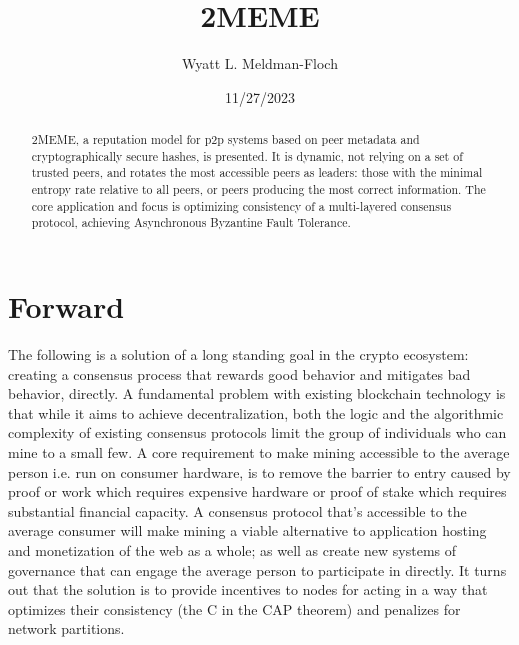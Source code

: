 \documentclass{article}
\title{2MEME}
\author{Wyatt L. Meldman-Floch}
\date{11/27/2023}
\begin{document}
\maketitle

\begin{abstract}
2MEME, a reputation model for p2p systems based on peer metadata and cryptographically secure hashes, is presented. It is dynamic, not relying on a set of trusted peers, and rotates the most accessible peers as leaders: those with the minimal entropy rate relative to all peers, or peers producing the most correct information. The core application and focus is optimizing consistency of a multi-layered consensus protocol, achieving Asynchronous Byzantine Fault Tolerance.

\end{abstract}

\tableofcontents

\setcounter{secnumdepth}{0}

\section{Forward}
\thispagestyle{FirstPage}
The following is a solution of a long standing goal in the crypto ecosystem: creating a consensus process that rewards good behavior and mitigates bad behavior, directly. A fundamental problem with existing blockchain technology is that while it aims to achieve decentralization, both the logic and the algorithmic complexity of existing consensus protocols limit the group of individuals who can mine to a small few. A core requirement to make mining accessible to the average person i.e. run on consumer hardware, is to remove the barrier to entry caused by proof or work which requires expensive hardware or proof of stake which requires substantial financial capacity. A consensus protocol that's accessible to the average consumer will make mining a viable alternative to application hosting and monetization of the web as a whole; as well as create new systems of governance that can engage the average person to participate in directly. It turns out that the solution is to provide incentives to nodes for acting in a way that optimizes their consistency (the C in the CAP theorem) and penalizes for network partitions.
\end{document}
